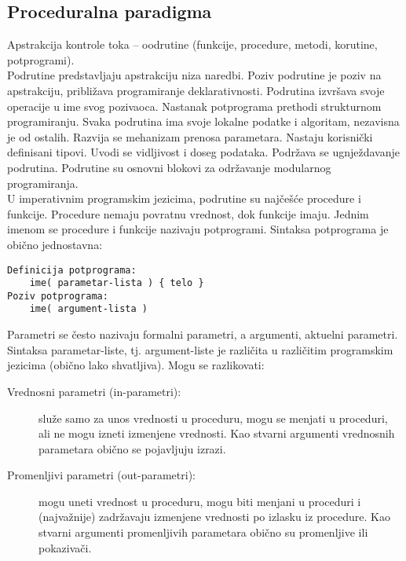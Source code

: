 \documentclass[../main.tex]{subfiles}
\begin{document}
\subsection{Proceduralna paradigma}
Apstrakcija kontrole toka -- oodrutine (funkcije, procedure, metodi, korutine, potprogrami). \\
Podrutine predstavljaju apstrakciju niza naredbi. Poziv podrutine je poziv na apstrakciju, približava programiranje deklarativnosti. Podrutina izvršava svoje operacije u ime svog pozivaoca. Nastanak potprograma prethodi strukturnom programiranju. Svaka podrutina ima svoje lokalne podatke i algoritam, nezavisna je od ostalih. Razvija se mehanizam prenosa parametara. Nastaju korisnički definisani tipovi. Uvodi se vidljivost i doseg podataka. Podržava se ugnježdavanje podrutina. Podrutine su osnovni blokovi za održavanje modularnog programiranja. 
\\
U imperativnim programskim jezicima, podrutine su najčešće procedure i funkcije. Procedure nemaju povratnu vrednost, dok funkcije imaju. Jednim imenom se procedure i funkcije nazivaju potprogrami. Sintaksa potprograma je obično jednostavna:
\begin{Verbatim}
Definicija potprograma:
	ime( parametar-lista ) { telo }
Poziv potprograma:
	ime( argument-lista )
\end{Verbatim}
Parametri se često nazivaju formalni parametri, a argumenti, aktuelni parametri. Sintaksa parametar-liste, tj. argument-liste je različita u različitim programskim jezicima (obično lako shvatljiva).
Mogu se razlikovati:
\begin{description}
\item[Vrednosni parametri (in-parametri):] služe samo za unos vrednosti u proceduru, mogu se menjati u proceduri, ali ne mogu izneti izmenjene vrednosti. Kao stvarni argumenti vrednosnih parametara obično se pojavljuju izrazi.
\item[Promenljivi parametri (out-parametri):] mogu uneti vrednost u proceduru, mogu biti menjani u proceduri i (najvažnije) zadržavaju izmenjene vrednosti po izlasku iz procedure. Kao stvarni argumenti promenljivih parametara obično su promenljive ili pokazivači.
\end{description}
\end{document}
